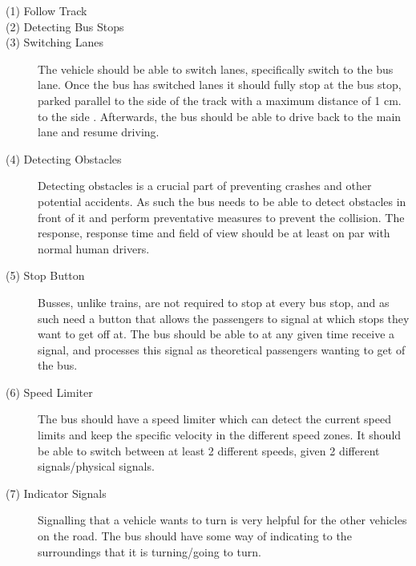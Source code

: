 \begin{description}
    \item [(1) Follow Track]


    
    \item[(2) Detecting Bus Stops]
    \unsure{}

    \item[(3) Switching Lanes] 
    
    
    The vehicle should be able to switch lanes, specifically switch to the bus lane. Once the bus has switched lanes it should fully stop at the bus stop, parked parallel to the side of the track with a maximum distance of 1 cm. to the side . Afterwards, the bus should be able to drive back to the main lane and resume driving.
    
    \item[(4) Detecting Obstacles]
    Detecting obstacles is a crucial part of preventing crashes and other potential accidents. As such the bus needs to be able to detect obstacles in front of it and perform preventative measures to prevent the collision. The response, response time and field of view should be at least on par with normal human drivers. 
    
    \item[(5) Stop Button]
    Busses, unlike trains, are not required to stop at every bus stop, and as such need a button that allows the passengers to signal at which stops they want to get off at. The bus should be able to at any given time receive a signal, and processes this signal as theoretical passengers wanting to get of the bus.
    
    \item[(6) Speed Limiter]
    The bus should have a speed limiter which can detect the current speed limits and keep the specific velocity in the different speed zones. It should be able to switch between at least 2 different speeds, given 2 different signals/physical signals.
    
    \item[(7) Indicator Signals]
    Signalling that a vehicle wants to turn is very helpful for the other vehicles on the road. The bus should have some way of indicating to the surroundings that it is turning/going to turn.
\end{description}